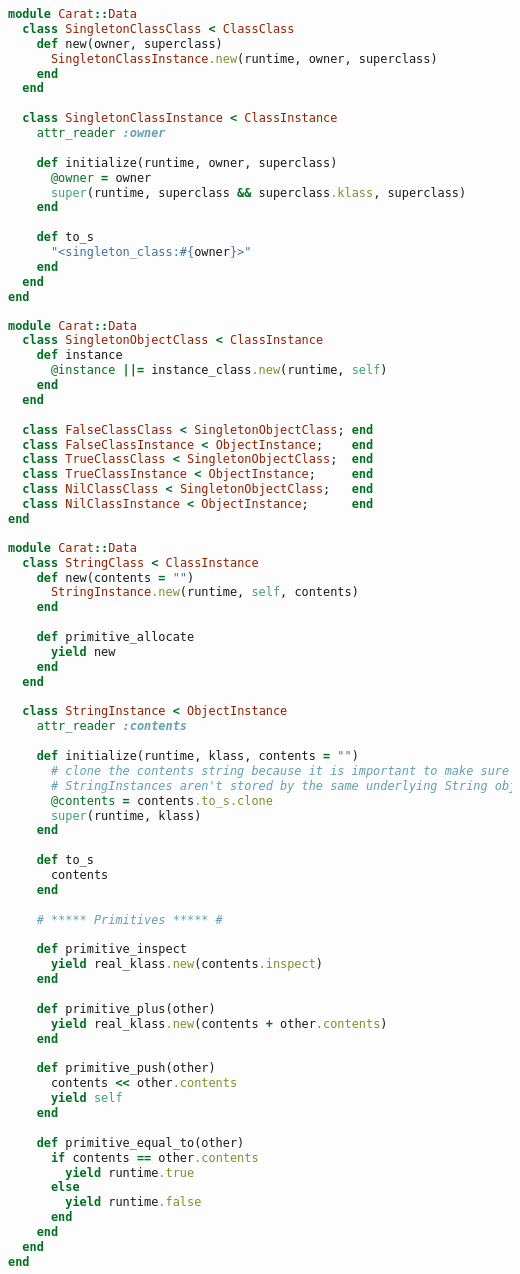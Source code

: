 \begin{lstlisting}[title={\small\ttfamily\bfseries data/singleton\_class.rb},language=Ruby]
module Carat::Data
  class SingletonClassClass < ClassClass
    def new(owner, superclass)
      SingletonClassInstance.new(runtime, owner, superclass)
    end
  end
  
  class SingletonClassInstance < ClassInstance
    attr_reader :owner
    
    def initialize(runtime, owner, superclass)
      @owner = owner
      super(runtime, superclass && superclass.klass, superclass)
    end
    
    def to_s
      "<singleton_class:#{owner}>"
    end
  end
end

\end{lstlisting}
\begin{lstlisting}[title={\small\ttfamily\bfseries data/singletons.rb},language=Ruby]
module Carat::Data
  class SingletonObjectClass < ClassInstance
    def instance
      @instance ||= instance_class.new(runtime, self)
    end
  end
  
  class FalseClassClass < SingletonObjectClass; end
  class FalseClassInstance < ObjectInstance;    end
  class TrueClassClass < SingletonObjectClass;  end
  class TrueClassInstance < ObjectInstance;     end
  class NilClassClass < SingletonObjectClass;   end
  class NilClassInstance < ObjectInstance;      end
end

\end{lstlisting}
\begin{lstlisting}[title={\small\ttfamily\bfseries data/string.rb},language=Ruby]
module Carat::Data
  class StringClass < ClassInstance
    def new(contents = "")
      StringInstance.new(runtime, self, contents)
    end
  
    def primitive_allocate
      yield new
    end
  end
  
  class StringInstance < ObjectInstance
    attr_reader :contents
  
    def initialize(runtime, klass, contents = "")
      # clone the contents string because it is important to make sure that two separate 
      # StringInstances aren't stored by the same underlying String object
      @contents = contents.to_s.clone
      super(runtime, klass)
    end
    
    def to_s
      contents
    end
    
    # ***** Primitives ***** #
    
    def primitive_inspect
      yield real_klass.new(contents.inspect)
    end
    
    def primitive_plus(other)
      yield real_klass.new(contents + other.contents)
    end
    
    def primitive_push(other)
      contents << other.contents
      yield self
    end
    
    def primitive_equal_to(other)
      if contents == other.contents
        yield runtime.true
      else
        yield runtime.false
      end
    end
  end
end

\end{lstlisting}
